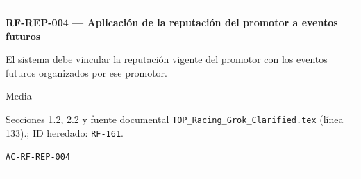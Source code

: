 \documentclass[10pt,letterpaper]{article}
\begin{document}
\vspace{0.25em}\hrule\vspace{0.65em}
\noindent\textbf{RF-REP-004 --- Aplicación de la reputación del promotor a eventos futuros}\par
\begin{description}[style=nextline,leftmargin=3.15cm,labelwidth=2.8cm,font=\normalfont\bfseries]
\item[Obligación] El sistema debe vincular la reputación vigente del promotor con los eventos futuros organizados por ese promotor.
\item[Prioridad] Media
\item[Procedencia] Secciones 1.2, 2.2 y fuente documental \texttt{TOP\_Racing\_Grok\_Clarified.tex} (línea 133).; ID heredado: \texttt{RF-161}.
\item[Verificación] \texttt{AC-RF-REP-004}
\end{description}
\vspace{0.25em}\hrule\vspace{0.65em}
\end{document}
